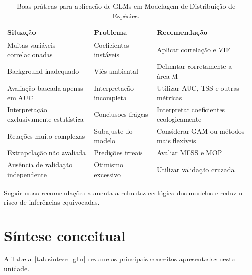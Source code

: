 \begin{table}[H]
	\centering
	\caption{Boas práticas para aplicação de GLMs em Modelagem de Distribuição de Espécies.}
	\begin{tabular}{p{4cm} p{5cm} p{6cm}}
		\hline
		Situação & Problema & Recomendação \\
		\hline
		Muitas variáveis correlacionadas & Coeficientes instáveis & Aplicar correlação e VIF \\
		Background inadequado & Viés ambiental & Delimitar corretamente a área M \\
		Avaliação baseada apenas em AUC & Interpretação incompleta & Utilizar AUC, TSS e outras métricas \\
		Interpretação exclusivamente estatística & Conclusões frágeis & Interpretar coeficientes ecologicamente \\
		Relações muito complexas & Subajuste do modelo & Considerar GAM ou métodos mais flexíveis \\
		Extrapolação não avaliada & Predições irreais & Avaliar MESS e MOP \\
		Ausência de validação independente & Otimismo excessivo & Utilizar validação cruzada \\
		\hline
	\end{tabular}
	\label{tab:boas_praticas_glm}
\end{table}

Seguir essas recomendações aumenta a robustez ecológica dos modelos e reduz o risco de inferências equivocadas.


\section{Síntese conceitual}

A Tabela~\ref{tab:sintese_glm} resume os principais conceitos apresentados nesta unidade.

